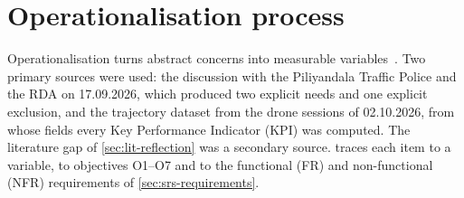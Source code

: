 \section{Operationalisation process}\label{sec:srs-operationalisation}

\begin{sloppypar}
Operationalisation turns abstract concerns into measurable variables~\cite{hudaib2018requirements}. Two primary sources were used: the discussion with the Piliyandala Traffic Police and the RDA on 17.09.2026, which produced two explicit needs and one explicit exclusion, and the trajectory dataset from the drone sessions of 02.10.2026, from whose fields every Key Performance Indicator (KPI) was computed. The literature gap of \cref{sec:lit-reflection} was a secondary source.  traces each item to a variable, to objectives O1--O7 and to the functional (FR) and non-functional (NFR) requirements of \cref{sec:srs-requirements}.
\end{sloppypar}

